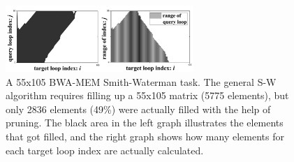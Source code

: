 \begin{figure}[!hbt]
	\begin{center}
		\includegraphics[width=2.8in]{Figures/Figure2C2.jpg}
		\caption {A 55x105 BWA-MEM Smith-Waterman task. The general S-W algorithm requires filling up a 55x105 matrix (5775 elements), but only 2836 elements (49\%) were actually filled with the help of pruning. The black area in the left graph illustrates the elements that got filled, and the right graph shows how many elements for each target loop index are actually calculated.}
		\label{fig:F2C2}
	\end{center}
\end{figure}
\vspace{-10pt}

